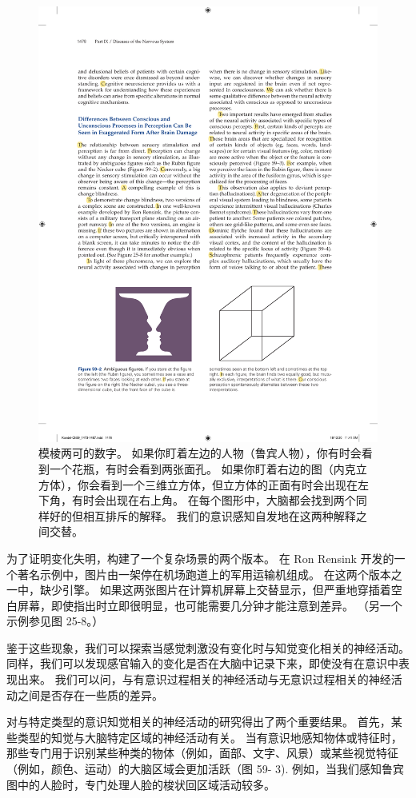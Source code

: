 \begin{figure}[htbp]
	\centering
	\includegraphics[width=0.7\linewidth]{chap59/fig_59_2}
	\caption{模棱两可的数字。 如果你盯着左边的人物（鲁宾人物），你有时会看到一个花瓶，有时会看到两张面孔。 如果你盯着右边的图（内克立方体），你会看到一个三维立方体，但立方体的正面有时会出现在左下角，有时会出现在右上角。 在每个图形中，大脑都会找到两个同样好的但相互排斥的解释。 我们的意识感知自发地在这两种解释之间交替。}
	\label{fig:59_2}
\end{figure}

为了证明变化失明，构建了一个复杂场景的两个版本。 在 Ron Rensink 开发的一个著名示例中，图片由一架停在机场跑道上的军用运输机组成。 在这两个版本之一中，缺少引擎。 如果这两张图片在计算机屏幕上交替显示，但严重地穿插着空白屏幕，即使指出时立即很明显，也可能需要几分钟才能注意到差异。 （另一个示例参见图 25-8。）

鉴于这些现象，我们可以探索当感觉刺激没有变化时与知觉变化相关的神经活动。 同样，我们可以发现感官输入的变化是否在大脑中记录下来，即使没有在意识中表现出来。 我们可以问，与有意识过程相关的神经活动与无意识过程相关的神经活动之间是否存在一些质的差异。

对与特定类型的意识知觉相关的神经活动的研究得出了两个重要结果。 首先，某些类型的知觉与大脑特定区域的神经活动有关。 当有意识地感知物体或特征时，那些专门用于识别某些种类的物体（例如，面部、文字、风景）或某些视觉特征（例如，颜色、运动）的大脑区域会更加活跃（图 59- 3). 例如，当我们感知鲁宾图中的人脸时，专门处理人脸的梭状回区域活动较多。

